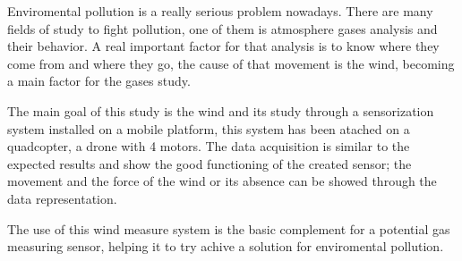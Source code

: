 
Enviromental pollution is a really serious problem nowadays. There are many fields of study to fight pollution, one of them is atmosphere gases analysis and their behavior. A real important factor for that analysis is to know where they come from and where they go, the cause of that movement is the wind, becoming a main factor for the gases study.

The main goal of this study is the wind and its study through a sensorization system installed on a mobile platform, this system has been atached on a quadcopter, a drone with 4 motors. The data acquisition is similar to the expected results and show the good functioning of the created sensor; the movement and the force of the wind or its absence can be showed through the data representation.

The use of this wind measure system is the basic complement for a potential gas measuring sensor, helping it to try achive a solution for enviromental pollution.